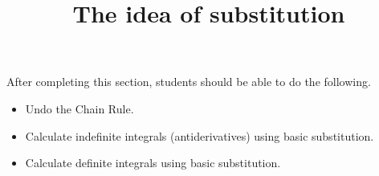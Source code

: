 \documentclass{ximera}
\title{The idea of substitution}
\begin{document}
\begin{abstract}
\end{abstract}

\maketitle

\begin{sectionOutcomes}

After completing this section, students should be able to do the following.

\begin{itemize}
	\item Undo the Chain Rule.
	\item Calculate indefinite integrals (antiderivatives) using basic substitution.
	\item Calculate definite integrals using basic substitution.
\end{itemize}

\end{sectionOutcomes}
\end{document}
